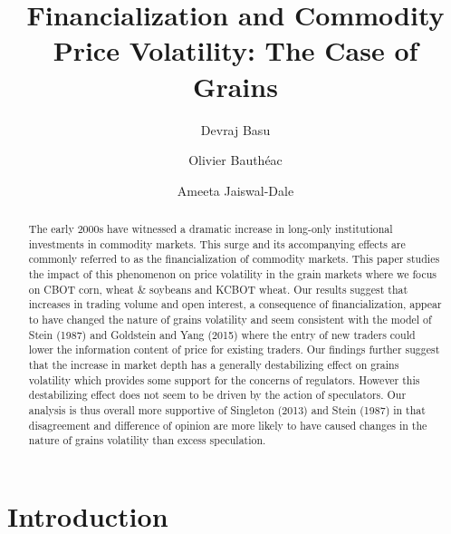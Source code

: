 \documentclass[]{elsarticle} %
\begin{document}
\begin{frontmatter}

  \title{Financialization and Commodity Price Volatility: The Case of Grains}
    \author[strathclyde]{Devraj Basu}
  
    \author[strathclyde]{Olivier Bauthéac}
  
    \author[thomas]{Ameeta Jaiswal-Dale}
  
      \address[strathclyde]{University of Strathclyde, Glasgow, UK}
    \address[thomas]{University of St.~Thomas, Minneapolis, US}
  
  \begin{abstract}
  The early 2000s have witnessed a dramatic increase in long-only
  institutional investments in commodity markets. This surge and its
  accompanying effects are commonly referred to as the financialization of
  commodity markets. This paper studies the impact of this phenomenon on
  price volatility in the grain markets where we focus on CBOT corn, wheat
  \& soybeans and KCBOT wheat. Our results suggest that increases in
  trading volume and open interest, a consequence of financialization,
  appear to have changed the nature of grains volatility and seem
  consistent with the model of Stein (1987) and Goldstein and Yang (2015)
  where the entry of new traders could lower the information content of
  price for existing traders. Our findings further suggest that the
  increase in market depth has a generally destabilizing effect on grains
  volatility which provides some support for the concerns of regulators.
  However this destabilizing effect does not seem to be driven by the
  action of speculators. Our analysis is thus overall more supportive of
  Singleton (2013) and Stein (1987) in that disagreement and difference of
  opinion are more likely to have caused changes in the nature of grains
  volatility than excess speculation.
  \end{abstract}
  
 \end{frontmatter}

\newpage

\hypertarget{introduction}{%
\section{Introduction}\label{introduction}}
\end{document}
